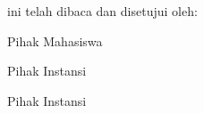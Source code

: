\clearpage
\begin{center}
 ini telah dibaca dan disetujui oleh:\par
\vspace{12pt}
Pihak Mahasiswa\par
\vspace{12pt}
\par
\vspace{12pt}
\NamaMhs\par
\NIM\par
\vspace{12pt}
Pihak Instansi\par
\vspace{12pt}
\par
\vspace{12pt}
\NamaPembimbingInstansi\par
\NoPegawaiPembimbingInstansi\par
\vspace{12pt}
Pihak Instansi\par
\vspace{12pt}
\par
\vspace{12pt}
\NamaAtasanInstansi\par
\NoPegawaiAtasanInstansi\par
\end{center}

